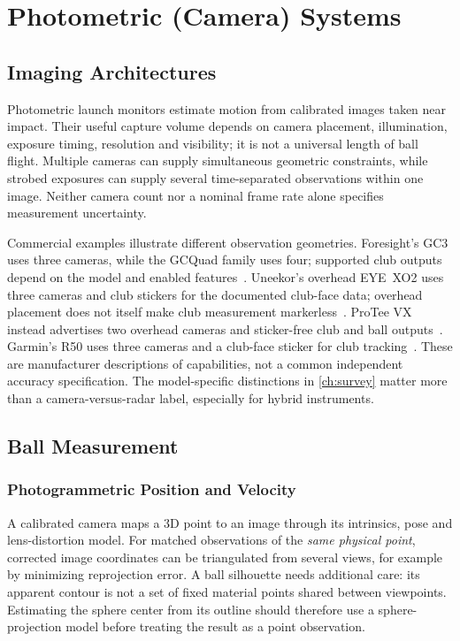 \chapter{Photometric (Camera) Systems}
\label{ch:camera}

\section{Imaging Architectures}
\label{sec:camarch}

Photometric launch monitors estimate motion from calibrated images taken near impact.
Their useful capture volume depends on camera placement, illumination, exposure timing, resolution and visibility; it is not a universal length of ball flight.
Multiple cameras can supply simultaneous geometric constraints, while strobed exposures can supply several time-separated observations within one image.
Neither camera count nor a nominal frame rate alone specifies measurement uncertainty.

Commercial examples illustrate different observation geometries.
Foresight's GC3 uses three cameras, while the GCQuad family uses four; supported club outputs depend on the model and enabled features~\cite{foresightgc3,foresightgcquad}.
Uneekor's overhead EYE~XO2 uses three cameras and club stickers for the documented club-face data; overhead placement does not itself make club measurement markerless~\cite{uneekorxo2manual}.
ProTee VX instead advertises two overhead cameras and sticker-free club and ball outputs~\cite{proteevx}.
Garmin's R50 uses three cameras and a club-face sticker for club tracking~\cite{garminr50,garminr50support,garminr50stickers}.
These are manufacturer descriptions of capabilities, not a common independent accuracy specification.
The model-specific distinctions in \cref{ch:survey} matter more than a camera-versus-radar label, especially for hybrid instruments.

\section{Ball Measurement}

\subsection{Photogrammetric Position and Velocity}

A calibrated camera maps a 3D point to an image through its intrinsics, pose and lens-distortion model.
For matched observations of the \emph{same physical point}, corrected image coordinates can be triangulated from several views, for example by minimizing reprojection error.
A ball silhouette needs additional care: its apparent contour is not a set of fixed material points shared between viewpoints.
Estimating the sphere center from its outline should therefore use a sphere-projection model before treating the result as a point observation.

